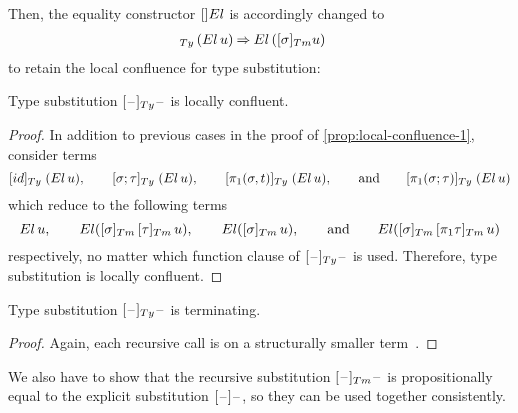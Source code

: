 \documentclass[a4paper,UKenglish,numberwithinsect,cleveref,thm-restate]{lipics-v2021}
\newcommand{\danger}{\marginpar[\hfill\dbend]{\dbend\hfill}}
\begin{document}
Then, the equality constructor $[]\El$ is accordingly changed to 
\begin{align}
  [ \sigma ]_{\Ty}\,(\El\, u) & \reduce \El\,([\sigma]_{\Tm} {u}) \label{eq:def-type-subst-7}
\end{align}
to retain the local confluence for type substitution:
\begin{proposition} \label{prop:local-confluence-2}
  Type substitution $[\blank]_{\Ty}\blank$ is locally confluent.
  \danger
\end{proposition}
\begin{proof}
  In addition to previous cases in the proof of \cref{prop:local-confluence-1}, consider terms 
  \[
    [\idS]_{\Ty}\;(\El\,u), \qquad [\sigma;\tau]_{\Ty}\;(\El\,u), \qquad [\pi_1(\sigma, t)]_{\Ty}\;(\El\,u), \qquad\text{and}\qquad [\pi_1(\sigma; \tau)]_{\Ty}\;(\El\,u)
  \]
  which reduce to the following terms
  \[
    \El\,u, \qquad \El([\sigma]_{\Tm}\,[\tau]_{\Tm}\,u), \qquad \El([\sigma]_{\Tm}\,u), \qquad\text{and}\qquad
    \El([\sigma]_{\Tm}\,[\pi_1\tau]_{\Tm}\,u)
  \]
  respectively, no matter which function clause of $[\blank]_{\Ty}\blank$ is used.
  Therefore, type substitution is locally confluent.
\end{proof}
\begin{proposition}[Termination]
  Type substitution $[\blank]_{\Ty}\blank$ is terminating.
  \danger
\end{proposition}
\begin{proof}
  Again, each recursive call is on a structurally smaller term~\cite{Abel2002}.
\end{proof}

We also have to show that the recursive substitution $[\blank]_{\Tm}\blank$ is propositionally equal to the explicit substitution $[\mathord{\hspace{1pt}\text{--}\hspace{1pt}}]\mathord{\hspace{1pt}\text{--}\hspace{1pt}}$, so they can be used together consistently.
\end{document}

